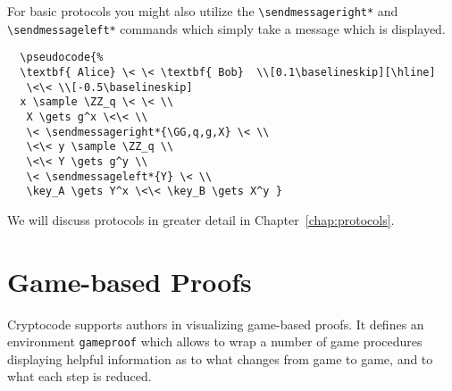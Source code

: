 \documentclass[a4paper]{report}
\begin{document}
  For basic protocols you might also utilize the \lstinline$\sendmessageright*$ and \lstinline$\sendmessageleft*$
  commands which simply take a message which is displayed.
  \begin{center}
  \end{center}
  \begin{lstlisting}
  \pseudocode{%
  \textbf{ Alice} \< \< \textbf{ Bob}  \\[0.1\baselineskip][\hline]
   \<\< \\[-0.5\baselineskip]
  x \sample \ZZ_q \< \< \\
   X \gets g^x \<\< \\
   \< \sendmessageright*{\GG,q,g,X} \< \\
   \<\< y \sample \ZZ_q \\
   \<\< Y \gets g^y \\
   \< \sendmessageleft*{Y} \< \\
   \key_A \gets Y^x \<\< \key_B \gets X^y }
  \end{lstlisting}
  We will discuss protocols in greater detail in Chapter~\ref{chap:protocols}.
  
  \section{Game-based Proofs}
  Cryptocode supports authors in visualizing game-based proofs. It defines an environment
  \lstinline$gameproof$ which allows to wrap a number of game procedures displaying helpful
  information as to what changes from game to game, and to what each step is reduced.
  
\end{document}
